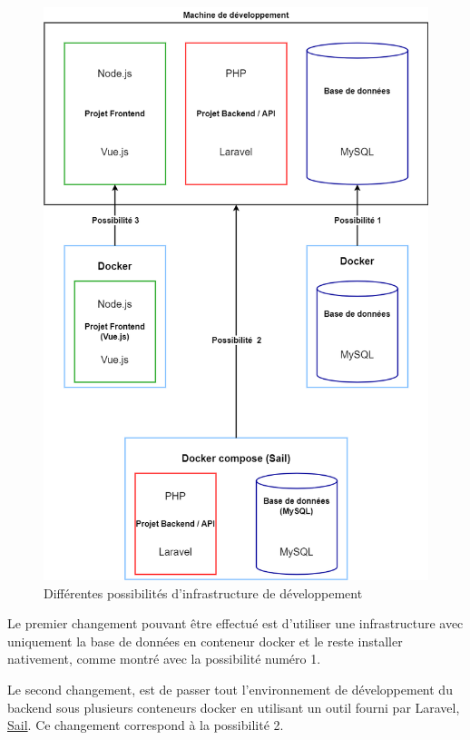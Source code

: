 \documentclass[
    iai, %
    il, %
]{heig-tb}
\begin{document}
\begin{center}
    \begin{figure}
        \includegraphics[width=\textwidth]{./assets/figures/infrastructure-dev-choix.drawio.png}
        \caption{Différentes possibilités d'infrastructure de développement \label{infrastructure-dev-choix.drawio}}
    \end{figure}
\end{center}

Le premier changement pouvant être effectué est d'utiliser une infrastructure avec uniquement la base de données en \Gls{conteneur} \Gls{docker} et le reste installer nativement, comme montré avec la possibilité numéro 1.

Le second changement, est de passer tout l'environnement de développement du \Gls{backend} sous plusieurs \Gls{conteneur}s \Gls{docker} en utilisant un outil fourni par Laravel, \href{https://laravel.com/docs/9.x/sail}{Sail}. Ce changement correspond à la possibilité 2.
\end{document}
